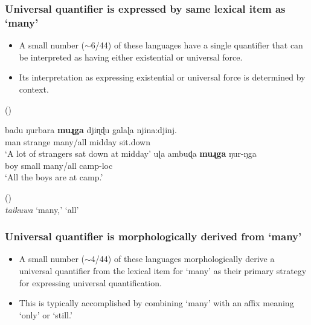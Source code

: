 \documentclass{article}
\begin{document}
\subsubsection{Universal quantifier is expressed by same lexical item as `many'}
\begin{itemize}
\item A small number  ($\sim$6/44) of these languages have a single quantifier that can be interpreted as having either existential or universal force.
\item Its interpretation as expressing existential or universal force is determined by context.
\end{itemize}
\begin{exe}
   (\citealt[56,65]{platt72}) 
  \begin{xlist}
    \ex \gll badu ŋurbara \textbf{muɻga} {djiɳɖu galaɭa} njina:djinj. \\ 
    man  strange  many/all  midday         sit.down\\
    \glt `A lot of strangers sat down at midday'
    \ex \gll uɭa ambuɖa \textbf{muɻga} ŋur-ŋga  \\
    boy   small    many/all      camp-{\sc loc}\\
    \glt        `All the boys are at camp.'%
  \end{xlist}
   (\citealt[85,107]{osborne74})\\
  {\it taikuwa} `many,' `all'

\end{exe}


\subsubsection{Universal quantifier is morphologically derived from `many'}

\begin{itemize}
\item A small number ($\sim$4/44) of these languages morphologically derive a universal quantifier from the lexical item for `many' as their primary strategy for expressing universal quantification.
\item This is typically accomplished by combining `many' with an affix meaning `only' or `still.'
\end{itemize}
\end{document}
